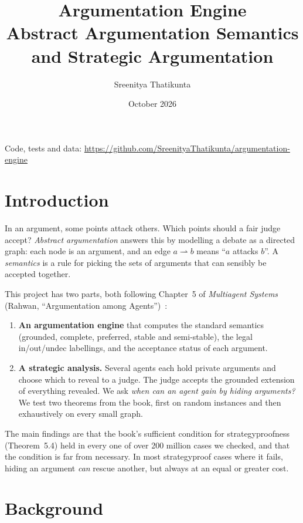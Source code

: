 \documentclass[11pt,a4paper]{article}
\title{\textbf{Argumentation Engine}\\[2pt]
\large Abstract Argumentation Semantics and Strategic Argumentation}
\author{Sreenitya Thatikunta}
\date{October 2026}
\newcommand{\att}{\rightharpoonup}
\begin{document}
\maketitle
\vspace{-1.2em}
\begin{center}
\small Code, tests and data: \url{https://github.com/SreenityaThatikunta/argumentation-engine}
\end{center}

\section{Introduction}

In an argument, some points attack others. Which points should a fair judge
accept? \emph{Abstract argumentation} answers this by modelling a debate as a
directed graph: each node is an argument, and an edge $a \att b$ means
``$a$ attacks $b$''. A \emph{semantics} is a rule for picking the sets of
arguments that can sensibly be accepted together.

This project has two parts, both following Chapter~5 of \emph{Multiagent
Systems} (Rahwan, ``Argumentation among Agents'')~\cite{rahwan}:

\begin{enumerate}
  \item \textbf{An argumentation engine} that computes the standard semantics
        (grounded, complete, preferred, stable and semi-stable), the legal
        in/out/undec labellings, and the acceptance status of each argument.
  \item \textbf{A strategic analysis.} Several agents each hold private
        arguments and choose which to reveal to a judge. The judge accepts the
        grounded extension of everything revealed. We ask \emph{when can an
        agent gain by hiding arguments?} We test two theorems from the book,
        first on random instances and then exhaustively on every small graph.
\end{enumerate}

The main findings are that the book's sufficient condition for
strategyproofness (Theorem~5.4) held in every one of over 200 million cases we
checked, and that the condition is far from necessary. In most strategyproof
cases where it fails, hiding an argument \emph{can} rescue another, but always
at an equal or greater cost.

\section{Background}
\end{document}
